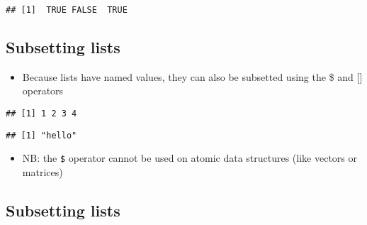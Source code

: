 \documentclass[]{article}
\newenvironment{Shaded}{\begin{snugshade}}{\end{snugshade}}
\newcommand{\KeywordTok}[1]{\textcolor[rgb]{0.13,0.29,0.53}{\textbf{#1}}}
\newcommand{\DataTypeTok}[1]{\textcolor[rgb]{0.13,0.29,0.53}{#1}}
\newcommand{\DecValTok}[1]{\textcolor[rgb]{0.00,0.00,0.81}{#1}}
\newcommand{\StringTok}[1]{\textcolor[rgb]{0.31,0.60,0.02}{#1}}
\newcommand{\OperatorTok}[1]{\textcolor[rgb]{0.81,0.36,0.00}{\textbf{#1}}}
\newcommand{\NormalTok}[1]{#1}
\providecommand{\tightlist}{%
  \setlength{\itemsep}{0pt}\setlength{\parskip}{0pt}}
\begin{document}
\begin{verbatim}
## [1]  TRUE FALSE  TRUE
\end{verbatim}

\subsection{Subsetting lists}\label{subsetting-lists}

\begin{itemize}
\tightlist
\item
  Because lists have named values, they can also be subsetted using the
  \$ and {[}{]} operators
\end{itemize}

\begin{Shaded}
\end{Shaded}

\begin{verbatim}
## [1] 1 2 3 4
\end{verbatim}

\begin{Shaded}
\end{Shaded}

\begin{verbatim}
## [1] "hello"
\end{verbatim}

\begin{itemize}
\tightlist
\item
  NB: the \texttt{\$} operator cannot be used on atomic data structures
  (like vectors or matrices)
\end{itemize}

\subsection{Subsetting lists}\label{subsetting-lists-1}
\end{document}
